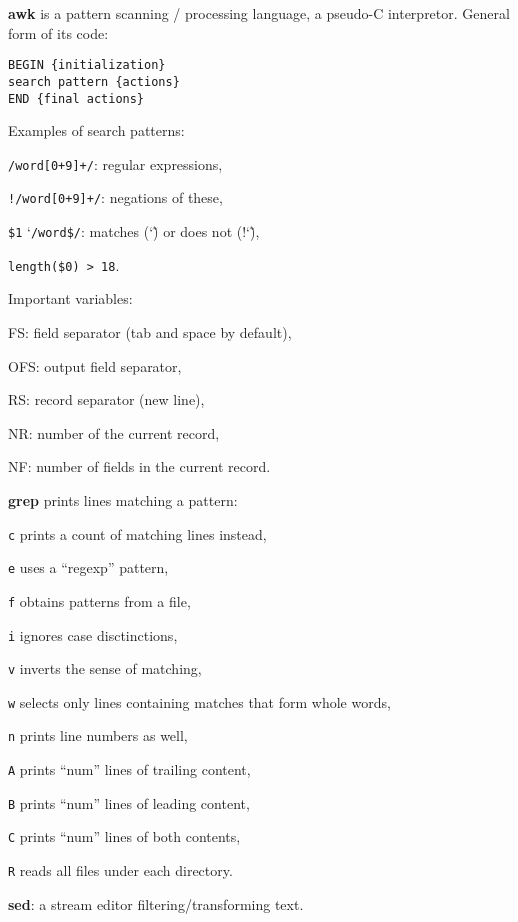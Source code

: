 \renewcommand\theFancyVerbLine{\normalsize\arabic{FancyVerbLine}}

\begin{enumx}
	\item [\cmd] \textbf{awk} is a pattern scanning / processing language,
	a pseudo-C interpretor.
	General form of its code:
\begin{verbatim}
BEGIN {initialization}
search pattern {actions}
END {final actions}
\end{verbatim}

\item [] Examples of search patterns:
\begin{enumx}
	\item \texttt{/word[0+9]+/}: regular expressions,
	\item \texttt{!/word[0+9]+/}: negations of these,
	\item \texttt{\$1} \char`\~ \texttt{/word\$/}: matches (\char`\~) or does not (!\char`\~),
	\item \texttt{length(\$0) > 18}.
\end{enumx} 

\item [] Important variables:
\begin{enumx}
	\item FS: field separator (tab and space by default),
	\item OFS: output field separator,
	\item RS: record separator (new line),
	\item NR: number of the current record,
	\item NF: number of fields in the current record.
\end{enumx} 

\item [\cmd] \textbf{grep} prints lines matching a pattern:
\item [\texttt{c}] prints a count of matching lines instead,
\item [\texttt{e}] uses a ``regexp'' pattern,
\item [\texttt{f}] obtains patterns from a file,
\item [\texttt{i}] ignores case disctinctions,
\item [\texttt{v}] inverts the sense of matching,
\item [\texttt{w}] selects only lines containing matches that form whole words,
\item [\texttt{n}] prints line numbers as well,
\item [\texttt{A}] prints ``num'' lines of trailing content,
\item [\texttt{B}] prints ``num'' lines of leading content,
\item [\texttt{C}] prints ``num'' lines of both contents,
\item [\texttt{R}] reads all files under each directory.
\item [\cmd] \textbf{sed}: a stream editor filtering/transforming text.
\end{enumx}

